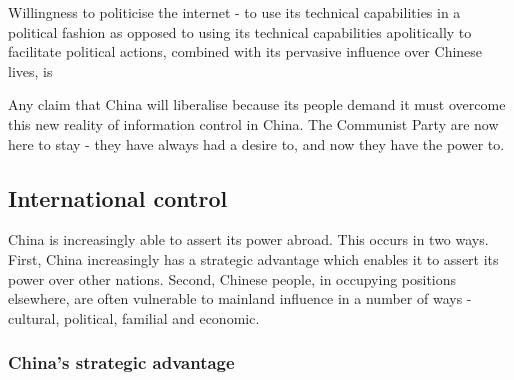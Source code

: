 \documentclass[11pt,a4paper]{report}
\begin{document}
\begin{multicols}{2}
Willingness to politicise the internet - to use its technical
capabilities in a political fashion as opposed to using its technical
capabilities apolitically to facilitate political actions, combined with
its pervasive influence over Chinese lives, is

Any claim that China will liberalise because its people demand it must
overcome this new reality of information control in China. The Communist
Party are now here to stay - they have always had a desire to, and now
they have the power to.

\end{multicols}

\subsection{International control}\label{international-control}

\begin{multicols}{2}
	
China is increasingly able to assert its power abroad. This occurs in
two ways. First, China increasingly has a strategic advantage which
enables it to assert its power over other nations. Second, Chinese
people, in occupying positions elsewhere, are often vulnerable to
mainland influence in a number of ways - cultural, political, familial
and economic.

\end{multicols}

\subsubsection{China's strategic
	advantage}\label{chinas-strategic-advantage}
\end{document}

